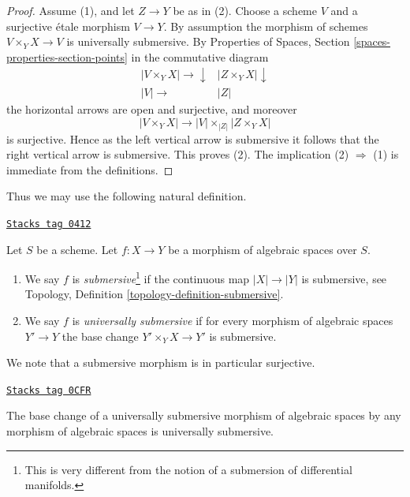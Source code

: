 \begin{proof}
Assume (1), and let $Z \to Y$ be as in (2). Choose a scheme $V$ and
a surjective \'etale morphism $V \to Y$. By assumption the morphism
of schemes $V \times_Y X \to V$ is universally submersive. By
Properties of Spaces, Section \ref{spaces-properties-section-points}
in the commutative diagram
$$
\begin{array}{cc}|V \times_Y X| \longrightarrow\downarrow & |Z \times_Y X| \downarrow \\ |V| \longrightarrow & |Z|\end{array}
$$
the horizontal arrows are open and surjective, and moreover
$$
|V \times_Y X| \longrightarrow |V| \times_{|Z|} |Z \times_Y X|
$$
is surjective. Hence as the left vertical arrow is submersive
it follows that the right vertical arrow is submersive.
This proves (2). The implication (2) $\Rightarrow$ (1) is
immediate from the definitions.
\end{proof}

Thus we may use the following natural definition.

\begin{definition}[Submersive]
\label{spaces-morphisms-definition-submersive}
\href{https://stacks.math.columbia.edu/tag/0412}{\texttt{Stacks tag 0412}}

Let $S$ be a scheme.
Let $f : X \to Y$ be a morphism of algebraic spaces over $S$.
\begin{enumerate}
\item We say $f$ is {\it submersive}\footnote{This is very different
from the notion of a submersion of differential manifolds.}
if the continuous map $|X| \to |Y|$ is submersive, see
Topology, Definition \ref{topology-definition-submersive}.
\item We say $f$ is {\it universally submersive} if for every
morphism of algebraic spaces $Y' \to Y$ the base change
$Y' \times_Y X \to Y'$ is submersive.
\end{enumerate}
\end{definition}

We note that a submersive morphism is in particular surjective.

\begin{lemma}
\label{spaces-morphisms-lemma-base-change-universally-submersive}
\href{https://stacks.math.columbia.edu/tag/0CFR}{\texttt{Stacks tag 0CFR}}

The base change of a universally submersive morphism of algebraic spaces
by any morphism of algebraic spaces is universally submersive.
\end{lemma}

